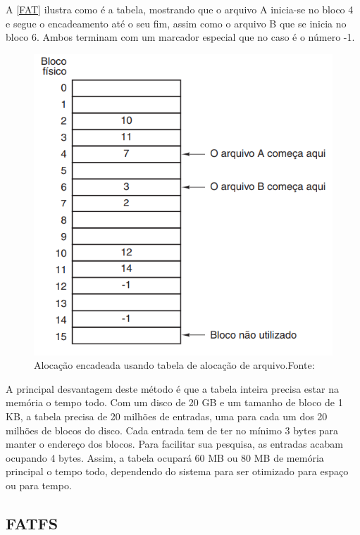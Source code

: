 A \autoref{FAT} ilustra como é a tabela, mostrando que o arquivo A inicia-se no bloco 4 e segue o encadeamento até o seu fim, assim como o arquivo B que se inicia no bloco 6. Ambos terminam com um marcador especial que no caso é o número -1.

\begin{figure}[H]
    \scriptsize
     \centering
     \includegraphics[scale=0.7]{dados/figuras/FAT.png}
     \caption{Alocação encadeada usando tabela de alocação de arquivo.\newline  Fonte:\cite{tanenbaumSO}}
     \label{FAT}
\end{figure}

A principal desvantagem deste método é que a tabela inteira precisa estar na memória o tempo todo. Com um disco de 20 GB e um tamanho de bloco de 1 KB, a tabela precisa de 20 milhões de entradas, uma para cada um dos 20 milhões de blocos do disco. Cada entrada tem de ter no mínimo 3 bytes para manter o endereço dos blocos. Para facilitar sua pesquisa, as entradas acabam ocupando 4 bytes. Assim, a tabela ocupará 60 MB ou 80 MB de memória principal o tempo todo, dependendo do sistema para ser otimizado para espaço ou para tempo.

\subsection{FATFS}

